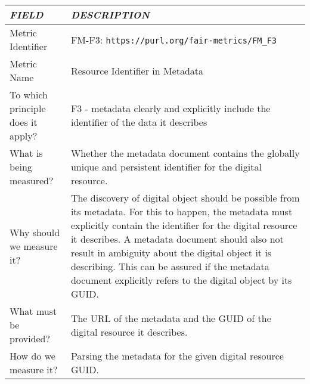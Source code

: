 \documentclass[english]{article}
\begin{document}
\newpage





\begin{longtable}{|p{5cm}|p{9cm}|}


\hline
\emph{FIELD} & \emph{DESCRIPTION} \\
\hline
Metric Identifier &   FM-F3: \verb"https://purl.org/fair-metrics/FM_F3"
 \\


\hline
Metric Name &   

Resource Identifier in Metadata


 \\



\hline
To which principle does it apply? &   
F3 - metadata clearly and explicitly include the identifier of the data it describes
\\



\hline
What is being measured? & 


Whether the metadata document contains the globally unique and persistent identifier for the digital resource.

\\



\hline
Why should we measure it? & 



The discovery of digital object should be possible from its metadata. For this to happen, the metadata must explicitly contain the identifier for the digital resource it describes. 
A metadata document should also not result in ambiguity about the digital object it is describing. This can be assured if the metadata document explicitly refers to the digital object by its GUID.

  
\\



\hline
What must be provided? &  


The URL of the metadata and the GUID of the digital resource it describes.


 \\



\hline
How do we measure it? &  

Parsing the metadata for the given digital resource GUID.

\\




\end{longtable}
\end{document}
